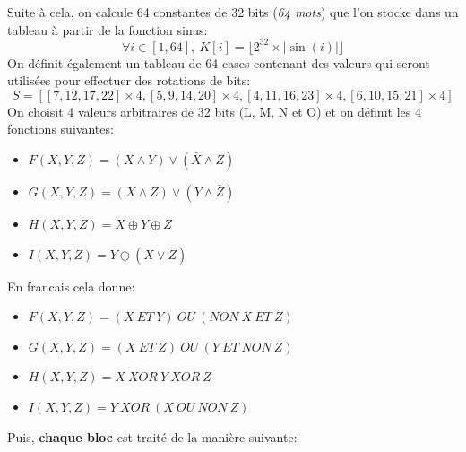 \documentclass[12pt, a4paper]{article}
\begin{document}
Suite à cela, on calcule 64 constantes de 32 bits (\textit{64 mots}) que l'on stocke dans un tableau à partir de la fonction sinus:
\[
    \forall i \in [1, 64],\
    K[i] = \lfloor 2^{32} \times \left | \sin(i) \right | \rfloor
\]
On définit également un tableau de 64 cases contenant des valeurs qui seront utilisées pour effectuer des rotations de bits:
\[
    S = \left [
        [7, 12, 17, 22] \times 4, [5, 9, 14, 20] \times 4, [4, 11, 16, 23] \times 4, [6, 10, 15, 21] \times 4 \right ]
\]
On choisit 4 valeurs arbitraires de 32 bits (L, M, N et O) et on définit les 4 fonctions suivantes:
\begin{itemize}
    \item $F(X, Y, Z) = (X \wedge Y) \vee (\bar X \wedge Z)$
    \item $G(X, Y, Z) = (X \wedge Z) \vee (Y \wedge \bar Z)$
    \item $H(X, Y, Z) = X \oplus Y \oplus Z$
    \item $I(X, Y, Z) = Y \oplus (X \vee \bar Z)$
\end{itemize}
\bigskip
En francais cela donne:
\begin{itemize}
    \item $F(X, Y, Z) = (X \ ET \ Y) \ OU \ (NON \ X \ ET \ Z)$
    \item $G(X, Y, Z) = (X \ ET \ Z) \ OU \ (Y \ ET \ NON \ Z)$
    \item $H(X, Y, Z) = X \ XOR \ Y \ XOR \ Z$
    \item $I(X, Y, Z) = Y \ XOR \ (X \ OU \ NON \ Z)$
\end{itemize}
\bigskip
Puis, \textbf{chaque bloc} est traité de la manière suivante:
\end{document}
